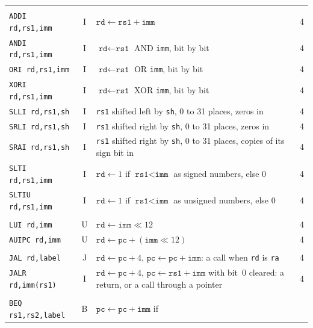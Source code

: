 \documentclass[11pt,a4paper]{report}
\begin{document}
\begin{footnotesize}
\begin{longtable}{@{}>{\raggedright\arraybackslash}p{3.3cm}c
    >{\raggedright\arraybackslash}p{8.4cm}c@{}}
  \midrule
  \multicolumn{4}{@{}l}{\emph{Register and immediate}} \\*
  \texttt{ADDI rd,rs1,imm} & I & $\texttt{rd} \leftarrow \texttt{rs1} + \texttt{imm}$ & 4 \\
  \texttt{ANDI rd,rs1,imm} & I & $\texttt{rd} \leftarrow \texttt{rs1}$ AND \texttt{imm}, bit
    by bit & 4 \\
  \texttt{ORI rd,rs1,imm} & I & $\texttt{rd} \leftarrow \texttt{rs1}$ OR \texttt{imm}, bit by
    bit & 4 \\
  \texttt{XORI rd,rs1,imm} & I & $\texttt{rd} \leftarrow \texttt{rs1}$ XOR \texttt{imm}, bit
    by bit & 4 \\
  \texttt{SLLI rd,rs1,sh} & I & \texttt{rs1} shifted left by \texttt{sh}, 0 to 31 places,
    zeros in & 4 \\
  \texttt{SRLI rd,rs1,sh} & I & \texttt{rs1} shifted right by \texttt{sh}, 0 to 31 places,
    zeros in & 4 \\
  \texttt{SRAI rd,rs1,sh} & I & \texttt{rs1} shifted right by \texttt{sh}, 0 to 31 places,
    copies of its sign bit in & 4 \\
  \texttt{SLTI rd,rs1,imm} & I & $\texttt{rd} \leftarrow 1$ if $\texttt{rs1} < \texttt{imm}$
    as signed numbers, else 0 & 4 \\
  \texttt{SLTIU rd,rs1,imm} & I & $\texttt{rd} \leftarrow 1$ if $\texttt{rs1} <
    \texttt{imm}$ as unsigned numbers, else 0 & 4 \\
  \midrule
  \multicolumn{4}{@{}l}{\emph{Upper immediate}} \\*
  \texttt{LUI rd,imm} & U & $\texttt{rd} \leftarrow \texttt{imm} \ll 12$ & 4 \\
  \texttt{AUIPC rd,imm} & U & $\texttt{rd} \leftarrow \texttt{pc} + (\texttt{imm} \ll 12)$
    & 4 \\
  \midrule
  \multicolumn{4}{@{}l}{\emph{Jumps}} \\*
  \texttt{JAL rd,label} & J & $\texttt{rd} \leftarrow \texttt{pc} + 4$,
    $\texttt{pc} \leftarrow \texttt{pc} + \texttt{imm}$: a call when \texttt{rd} is
    \texttt{ra} & 4 \\
  \texttt{JALR rd,imm(rs1)} & I & $\texttt{rd} \leftarrow \texttt{pc} + 4$,
    $\texttt{pc} \leftarrow \texttt{rs1} + \texttt{imm}$ with bit~0 cleared: a return, or a
    call through a pointer & 4 \\
  \midrule
  \multicolumn{4}{@{}l}{\emph{Branches}} \\*
  \texttt{BEQ rs1,rs2,label} & B & $\texttt{pc} \leftarrow \texttt{pc} + \texttt{imm}$ if

\end{longtable}
\end{footnotesize}
\end{document}
